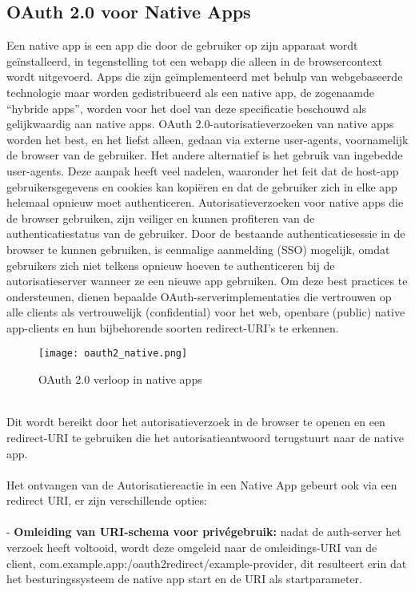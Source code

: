   \subsection{OAuth 2.0 voor Native Apps}%
  \label{subsec:oauth-2.0-voor-native-apps}
  \autocite{Denniss2017}
  Een native app is een app die door de gebruiker op zijn apparaat wordt geïnstalleerd, in tegenstelling tot een webapp die alleen in de browsercontext wordt uitgevoerd. Apps die zijn geïmplementeerd met behulp van webgebaseerde technologie maar worden gedistribueerd als een native app, de zogenaamde ``hybride apps'', worden voor het doel van deze specificatie beschouwd als gelijkwaardig aan native apps.
  OAuth 2.0-autorisatieverzoeken van native apps worden het best, en het liefst alleen, gedaan via externe user-agents, voornamelijk de browser van de gebruiker. Het andere alternatief is het gebruik van ingebedde user-agents. Deze aanpak heeft veel nadelen, waaronder het feit dat de host-app gebruikersgegevens en cookies kan kopiëren en dat de gebruiker zich in elke app helemaal opnieuw moet authenticeren. Autorisatieverzoeken voor native apps die de browser gebruiken, zijn veiliger en kunnen profiteren van de authenticatiestatus van de gebruiker. Door de bestaande authenticatiesessie in de browser te kunnen gebruiken, is eenmalige aanmelding (SSO) mogelijk, omdat gebruikers zich niet telkens opnieuw hoeven te authenticeren bij de autorisatieserver wanneer ze een nieuwe app gebruiken.
  Om deze best practices te ondersteunen, dienen bepaalde OAuth-serverimplementaties die vertrouwen op alle clients als vertrouwelijk (confidential) voor het web, openbare (public) native app-clients en hun bijbehorende soorten redirect-URI's te erkennen.
  \begin{figure}[h]
    \centering
    \texttt{[image: oauth2\_native.png]}
    \caption{OAuth 2.0 verloop in native apps}
    \label{fig:example2}
  \end{figure}
  \\
  Dit wordt bereikt door het autorisatieverzoek in de browser te openen en een redirect-URI te gebruiken die het autorisatieantwoord terugstuurt naar de native app.
  \\
  \\
  Het ontvangen van de Autorisatiereactie in een Native App gebeurt ook via een redirect URI, er zijn verschillende opties:
  \\\\
  - \textbf{Omleiding van URI-schema voor privégebruik:} nadat de auth-server het verzoek heeft voltooid, wordt deze omgeleid naar de omleidings-URI van de client, com.example.app:/oauth2redirect/example-provider, dit resulteert erin dat het besturingssysteem de native app start en de URI als startparameter.
